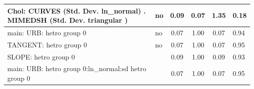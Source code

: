 \begin{table}
\begin{center}
\begin{tabular}{|l|l|c|c|c|l|}
			 Chol: CURVES (Std. Dev. ln_normal) . MIMEDSH (Std. Dev.   triangular ) & no & 0.09 & 0.07 & 1.35 & 0.18 \\
			\hline
			main: URB: hetro group 0 & no & 0.07 & 1.00 & 0.07 & 0.94 \\
			\hline
			TANGENT: hetro group 0 & no & 0.07 & 1.00 & 0.07 & 0.95 \\
			\hline
			SLOPE: hetro group 0 &  & 0.09 & 1.00 & 0.09 & 0.93 \\
			\hline
			main: URB: hetro group 0:ln_normal:sd  hetro group 0 &  & 0.07 & 1.00 & 0.07 & 0.95 \\
			\hline
		\end{tabular}
	\end{center}
\end{table}